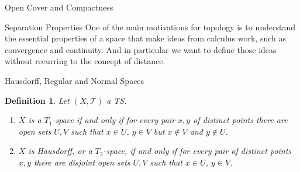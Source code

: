 \documentclass[12pt]{article}
\newtheorem{definition}{Definition}
\begin{document}
\begin{section}{Open Cover and Compactness}
\end{section}



\begin{section}{Separation Properties}
One of the main motivations for topology is to understand the essential properties of a space that make ideas from calculus work, such as convergence and continuity. And in particular we want to define those ideas without recurring to the concept of distance.

\begin{subsection}{Hausdorff, Regular and Normal Spaces}
\begin{definition}
Let $\left(X, \mathcal{T}\right)$ a TS.
	\begin{enumerate}
		\item $X$ is a $T_{1}$-space if and only if for every pair $x,y$ of distinct points there are open sets $U,V$ such that $x\in U$, $y\in V$ but $x\notin V$ and $y\notin U$.
		\item $X$ is Hausdorff, or a $T_{2}$-space, if and only if for every pair of distinct points $x,y$ there are disjoint open sets $U,V$ such that $x\in U$, $y\in V$.
	\end{enumerate}

\end{definition}

\end{subsection}





\end{section}
\end{document}
